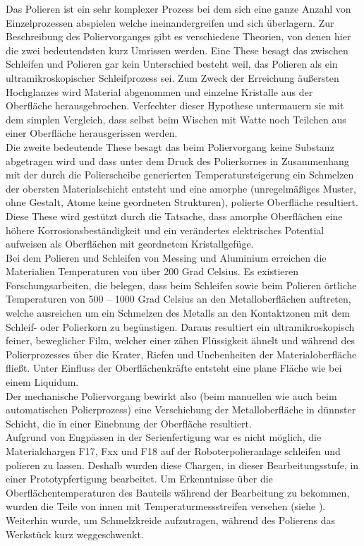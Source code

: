 \documentclass[12pt,a4paper,parskip,twoside,BCOR5mm,headsepline]{scrartcl}
\begin{document}
Das Polieren ist ein sehr komplexer Prozess bei dem sich eine ganze Anzahl von Einzelprozessen abspielen welche ineinandergreifen und sich überlagern. Zur Beschreibung des Poliervorganges gibt es verschiedene Theorien,  von denen hier die zwei bedeutendsten kurz Umrissen werden. Eine These besagt das zwischen Schleifen und Polieren gar kein Unterschied besteht weil,  das Polieren als ein ultramikroskopischer Schleifprozess sei. Zum Zweck der Erreichung  äußersten Hochglanzes wird Material abgenommen und einzelne Kristalle aus der Oberfläche herausgebrochen. Verfechter dieser Hypothese untermauern sie mit dem simplen Vergleich, dass selbst beim Wischen mit Watte noch Teilchen aus einer Oberfläche herausgerissen werden.\\ Die zweite bedeutende These besagt das beim Poliervorgang keine Substanz abgetragen wird und dass unter dem Druck des Polierkornes in Zusammenhang mit der durch die Polierscheibe generierten Temperatursteigerung ein Schmelzen der obersten Materialschicht entsteht und eine amorphe (unregelmäßiges Muster, ohne Gestalt, Atome keine geordneten Strukturen), polierte Oberfläche resultiert. Diese These wird gestützt durch die Tatsache, dass amorphe Oberflächen eine höhere Korrosionsbeständigkeit und ein verändertes elektrisches Potential aufweisen als Oberflächen mit geordnetem Kristallgefüge. \autocite[38]{hsp}\\  Bei dem Polieren und Schleifen von Messing und Aluminium erreichen die Materialien Temperaturen von über 200 Grad Celsius. Es existieren Forschungsarbeiten,  die belegen,  dass beim  Schleifen sowie beim Polieren örtliche Temperaturen von 500 – 1000 Grad Celsius an den Metalloberflächen auftreten, welche ausreichen um ein Schmelzen des Metalls an den Kontaktzonen mit dem Schleif- oder Polierkorn zu  begünstigen. Daraus resultiert ein ultramikroskopisch feiner, beweglicher Film,  welcher  einer zähen Flüssigkeit ähnelt und während des Polierprozesses über die Krater, Riefen und Unebenheiten der Materialoberfläche fließt. Unter Einfluss der Oberflächenkräfte entsteht eine plane Fläche wie bei einem Liquidum.\\ Der mechanische Poliervorgang bewirkt also (beim manuellen wie auch beim automatischen Polierprozess) eine Verschiebung der Metalloberfläche in dünnster Schicht, die in einer Einebnung der Oberfläche resultiert. \autocite[40-41]{hsp} \\
Aufgrund von Engpässen in der Serienfertigung war es nicht möglich,  die Materialchargen F17, Fxx und F18 auf der Roboterpolieranlage schleifen und polieren zu lassen. Deshalb wurden  diese Chargen,
   in dieser Bearbeitungsstufe, in einer Prototypfertigung bearbeitet. Um Erkenntnisse über die Oberflächentemperaturen des Bauteils während der Bearbeitung zu bekommen, wurden die Teile von innen mit Temperaturmessstreifen versehen (siehe ). Weiterhin wurde, um Schmelzkreide aufzutragen, während des Polierens das Werkstück kurz weggeschwenkt.
\end{document}
